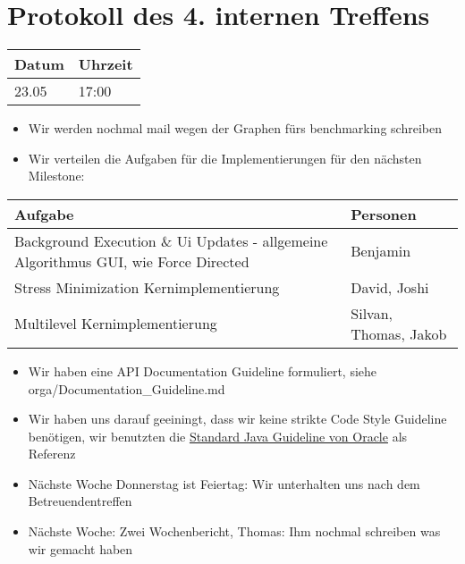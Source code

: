 \documentclass[]{article}
\date{}
\providecommand{\tightlist}{%
  \setlength{\itemsep}{0pt}\setlength{\parskip}{0pt}}
\begin{document}
\section{Protokoll des 4. internen
Treffens}\label{protokoll-des-4.-internen-treffens}

\begin{center}
\begin{tabular}{|l|l|}
\hline
Datum & Uhrzeit \\ \hline
23.05 & 17:00 \\ \hline
\end{tabular}
\end{center}

\begin{itemize}
\tightlist
\item
  Wir werden nochmal mail wegen der Graphen fürs benchmarking schreiben
\item
  Wir verteilen die Aufgaben für die Implementierungen für den nächsten
  Milestone:
\end{itemize}

\begin{center}
\begin{tabular}{|p{6cm}|l|}
\hline
Aufgabe  & Personen \\ \hline
Background Execution \& Ui Updates - allgemeine Algorithmus GUI, wie
Force Directed & Benjamin \\ \hline
Stress Minimization Kernimplementierung & David, Joshi \\ \hline
Multilevel Kernimplementierung & Silvan, Thomas, Jakob \\ \hline
\end{tabular}
\end{center}

\begin{itemize}
\tightlist
\item
  Wir haben eine API Documentation Guideline formuliert, siehe
  orga/Documentation\_Guideline.md
\item
  Wir haben uns darauf geeiningt, dass wir keine strikte Code Style
  Guideline benötigen, wir benutzten die
  \href{https://www.oracle.com/technetwork/java/javase/documentation/codeconventions-142311.html\#449}{Standard
  Java Guideline von Oracle} als Referenz
\item
  Nächste Woche Donnerstag ist Feiertag: Wir unterhalten uns nach dem
  Betreuendentreffen
\item
  Nächste Woche: Zwei Wochenbericht, Thomas: Ihm nochmal schreiben was
  wir gemacht haben
\end{itemize}
\end{document}
